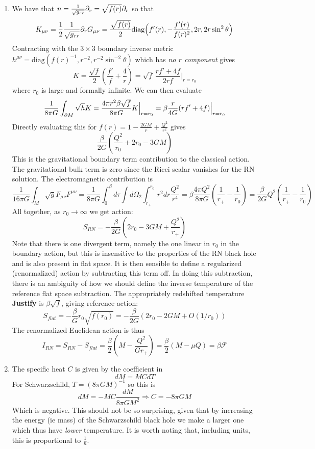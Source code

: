 \documentclass[11pt, class=article, crop=false]{standalone}
\begin{document}
\begin{enumerate}
	\item We have that $n = \frac{1}{\sqrt{g_{rr}}} \partial_r = \sqrt{f(r)} \partial_r$ so that
	\[
		K_{\mu \nu} = \frac12  \frac{1}{\sqrt{g_{rr}}} \partial_r G_{\mu \nu} = \frac{\sqrt{f(r)}}{2} \text{diag}\Big(f'(r), -\frac{f'(r)}{f(r)^2}, 2r, 2r \sin^2 \theta \Big)
	\]
	Contracting with the $3 \times 3$ boundary inverse metric $h^{\mu \nu} = \text{diag}(f(r)^{-1}, r^{-2}, r^{-2} \sin^{-2} \theta)$ which has \emph{no $r$ component} gives
	\[
		K =  \frac{\sqrt{f}}{2} \left(\frac{f'}{f} + \frac{4}{r} \right) = \sqrt{f} \, \frac{r f' + 4 f}{2 r f} \Big|_{r = r_0}
	\]
	where $r_0$ is large and formally infinite. We can then evaluate 
	\[
		\frac{1}{8 \pi G} \int_{\partial M} \sqrt{h} K = \frac{4 \pi r^2 \beta \sqrt{f}}{8 \pi G} K\Big|_{r=r_0} = \beta \frac{r}{4G} (r f' + 4 f)\Big|_{r=r_0} 
	\]
	Directly evaluating this for $f(r) = 1 - \frac{2 G M}{r} + \frac{Q^2}{r^2}$ gives
	\[
		\frac{\beta}{2 G} \left(\frac{Q^2}{r_0} + 2 r_0 - 3 G M \right)
	\]
	This is the gravitational boundary term contribution to the classical action. 
	 The gravitational bulk term is zero since the Ricci scalar vanishes for the RN solution. The electromagnetic contribution is
	\[
		\frac{1}{16 \pi G} \int_M \sqrt{g} F_{\mu \nu} F^{\mu \nu} = \frac{1}{8 \pi G} \int_0^\beta d\tau \int d\Omega_2 \int_{r_+}^{r_0} r^2 dr \frac{Q^2}{r^4} = \beta \frac{4 \pi Q^2}{8 \pi G} \left(\frac{1}{r_+} - \frac{1}{r_0} \right) = \frac{\beta}{2G} Q^2 \left(\frac{1}{r_+} - \frac{1}{r_0}\right)
	\]
	All together, as $r_0 \to \infty$ we get action:
	\[
		S_{RN} = -\frac{\beta}{2G} \left(2 r_0 - 3 G M + \frac{Q^2}{r_+} \right)
	\]
	Note that there is one divergent term, namely the one linear in $r_0$ in the boundary action, but this is insensitive to the properties of the RN black hole and is also present in flat space. It is then sensible to define a regularized (renormalized) action by subtracting this term off. In doing this subtraction, there is an ambiguity of how we should define the inverse temperature of the reference flat space subtraction. The appropriately redshifted temperature \textbf{Justify} is $\beta \sqrt{f}$, giving reference action:
		\[
			S_{flat} =  -\frac{\beta}{G} r_0 \sqrt{f(r_0)} = - \frac{\beta}{2G} (2 r_0 - 2 G M + O(1/r_0))
		\]
	The renormalized Euclidean action is thus 
	\[
		I_{RN} = S_{RN} - S_{flat} = \frac{\beta}{2} (M - \frac{Q^2}{G r_+}) = \frac{\beta}{2} (M -  \mu Q) = \beta \mathcal F
	\]
	\item The specific heat $C$ is given by the coefficient in
	\[
		dM = M C dT
	\]
	For Schwarzschild, $T = (8 \pi G M)^{-1}$ so this is 
	\[
		dM = - M C \frac{dM}{8 \pi G M^2} \Rightarrow C = -8 \pi G M
	\]
	Which is negative. This should not be so surprising, given that by increasing the energy (ie mass) of the Schwarzschild black hole we make a larger one which thus have \emph{lower} temperature. It is worth noting that, including units, this is proportional to $\frac1\hbar$.
	

\end{enumerate}
\end{document}
